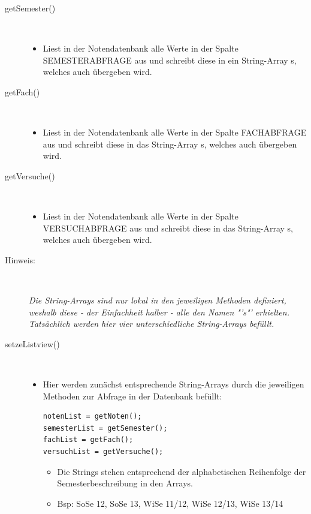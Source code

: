 \begin{description}
 
\item[getSemester()]~\par
\begin{itemize}
\item Liest in der Notendatenbank alle Werte in der Spalte \textcolor{lila}{SEMESTERABFRAGE} aus und schreibt diese in ein String-Array s, welches auch übergeben wird. 
\end{itemize} 
\item[getFach()]~\par
\begin{itemize}
\item Liest in der Notendatenbank alle Werte in der Spalte \textcolor{lila}{FACHABFRAGE} aus und schreibt diese in das String-Array s, welches auch übergeben wird.
\end{itemize}

\item[getVersuche()]~\par
\begin{itemize}
\item Liest in der Notendatenbank alle Werte in der Spalte \textcolor{lila}{VERSUCHABFRAGE} aus und schreibt diese in das String-Array s, welches auch übergeben wird.
\end{itemize}
\item[Hinweis:]~\par \textit{Die String-Arrays sind nur lokal in den jeweiligen Methoden definiert, weshalb diese - der Einfachheit halber - alle den Namen "'s"' erhielten. Tatsächlich werden hier vier unterschiedliche String-Arrays befüllt.}
 
\item[setzeListview()]~\par
\begin{itemize}
\item Hier werden zunächst entsprechende String-Arrays durch die jeweiligen Methoden zur Abfrage in der Datenbank befüllt:
\begin{lstlisting}
notenList = getNoten();
semesterList = getSemester();
fachList = getFach();
versuchList = getVersuche();
\end{lstlisting}
\begin{itemize}
\item Die Strings stehen entsprechend der alphabetischen Reihenfolge der Semesterbeschreibung in den Arrays.
\item Bsp: SoSe 12, SoSe 13, WiSe 11/12, WiSe 12/13, WiSe 13/14
\end{itemize}


\end{itemize}
\end{description}
